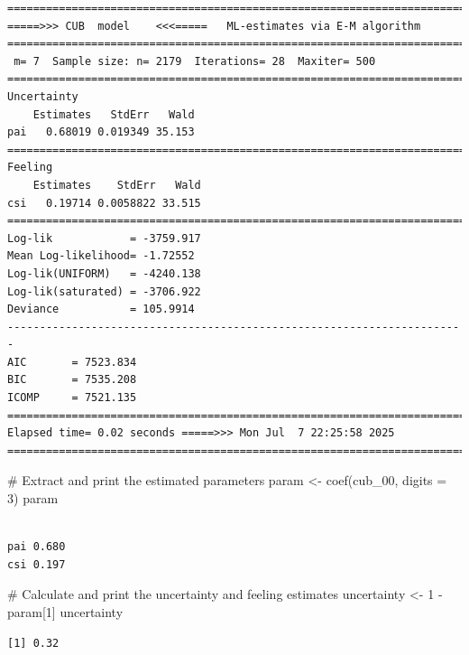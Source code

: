\documentclass[
  letterpaper,
  DIV=11,
  numbers=noendperiod]{scrartcl}
\newenvironment{Shaded}{\begin{snugshade}}{\end{snugshade}}
\newcommand{\AttributeTok}[1]{\textcolor[rgb]{0.40,0.45,0.13}{#1}}
\newcommand{\CommentTok}[1]{\textcolor[rgb]{0.37,0.37,0.37}{#1}}
\newcommand{\DecValTok}[1]{\textcolor[rgb]{0.68,0.00,0.00}{#1}}
\newcommand{\FunctionTok}[1]{\textcolor[rgb]{0.28,0.35,0.67}{#1}}
\newcommand{\NormalTok}[1]{\textcolor[rgb]{0.00,0.23,0.31}{#1}}
\newcommand{\OtherTok}[1]{\textcolor[rgb]{0.00,0.23,0.31}{#1}}
\newcommand{\SpecialCharTok}[1]{\textcolor[rgb]{0.37,0.37,0.37}{#1}}
\begin{document}
\begin{verbatim}
======================================================================= 
=====>>> CUB  model    <<<=====   ML-estimates via E-M algorithm   
======================================================================= 
 m= 7  Sample size: n= 2179  Iterations= 28  Maxiter= 500 
======================================================================= 
Uncertainty                                            
    Estimates   StdErr   Wald
pai   0.68019 0.019349 35.153
======================================================================= 
Feeling                                            
    Estimates    StdErr   Wald
csi   0.19714 0.0058822 33.515
======================================================================= 
Log-lik            = -3759.917 
Mean Log-likelihood= -1.72552 
Log-lik(UNIFORM)   = -4240.138 
Log-lik(saturated) = -3706.922 
Deviance           = 105.9914 
----------------------------------------------------------------------- 
AIC       = 7523.834 
BIC       = 7535.208 
ICOMP     = 7521.135 
======================================================================= 
Elapsed time= 0.02 seconds =====>>> Mon Jul  7 22:25:58 2025 
======================================================================= 
\end{verbatim}

\begin{Shaded}
\begin{Highlighting}[]
\CommentTok{\# Extract and print the estimated parameters}
\NormalTok{param }\OtherTok{\textless{}{-}} \FunctionTok{coef}\NormalTok{(cub\_00, }\AttributeTok{digits =} \DecValTok{3}\NormalTok{)}
\NormalTok{param}
\end{Highlighting}
\end{Shaded}

\begin{verbatim}
         
pai 0.680
csi 0.197
\end{verbatim}

\begin{Shaded}
\begin{Highlighting}[]
\CommentTok{\# Calculate and print the uncertainty and feeling estimates}
\NormalTok{uncertainty }\OtherTok{\textless{}{-}} \DecValTok{1} \SpecialCharTok{{-}}\NormalTok{ param[}\DecValTok{1}\NormalTok{]}
\NormalTok{uncertainty}
\end{Highlighting}
\end{Shaded}

\begin{verbatim}
[1] 0.32
\end{verbatim}
\end{document}
